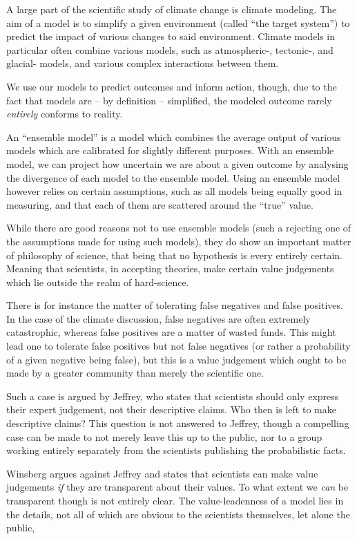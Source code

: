 \documentclass[12pt]{report}
\begin{document}
A large part of the scientific study of climate change is climate modeling. The
aim of a model is to simplify a given environment (called ``the target system'')
to predict the impact of various changes to said environment. Climate models in
particular often combine various models, such as atmospheric-, tectonic-, and
glacial- models, and various complex interactions between them.

We use our models to predict outcomes and inform action, though, due to the fact
that models are -- by definition -- simplified, the modeled outcome rarely
\emph{entirely} conforms to reality.

An ``ensemble model'' is a model which combines the average output of various
models which are calibrated for slightly different purposes. With an ensemble
model, we can project how uncertain we are about a given outcome by analysing
the divergence of each model to the ensemble model.  Using an ensemble model
however relies on certain assumptions, such as all models being equally good in
measuring, and that each of them are scattered around the ``true'' value.

While there are good reasons not to use ensemble models (such a rejecting one of
the assumptions made for using such models), they do show an important matter of
philosophy of science, that being that no hypothesis is every entirely certain.
Meaning that scientists, in accepting theories, make certain value judgements
which lie outside the realm of hard-science.

There is for instance the matter of tolerating false negatives and false
positives. In the case of the climate discussion, false negatives are often
extremely catastrophic, whereas false positives are a matter of wasted funds.
This might lead one to tolerate false positives but not false negatives (or
rather a probability of a given negative being false), but this is a value
judgement which ought to be made by a greater community than merely the
scientific one.

Such a case is argued by Jeffrey, who states that scientists should only express
their expert judgement, not their descriptive claims. Who then is left to make
descriptive claims? This question is not answered to Jeffrey, though a
compelling case can be made to not merely leave this up to the public, nor to a
group working entirely separately from the scientists publishing the
probabilistic facts.

Winsberg argues against Jeffrey and states that scientists can make value
judgements \emph{if} they are transparent about their values. To what extent we
\emph{can} be transparent though is not entirely clear. The value-leadenness of
a model lies in the details, not all of which are obvious to the scientists
themselves, let alone the public,
\end{document}
